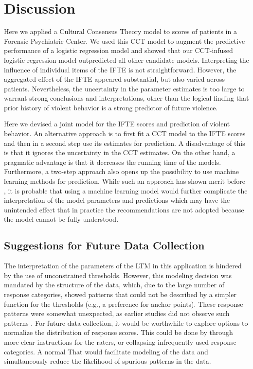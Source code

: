 \documentclass[a4paper,11pt]{article}
\begin{document}
\section{Discussion}
Here we applied a Cultural Consensus Theory model to scores of patients in a Forensic Psychiatric Center.
We used this CCT model to augment the predictive performance of a logistic regression model and showed that our CCT-infused logistic regression model outpredicted all other candidate models.
Interpreting the influence of individual items of the IFTE is not straightforward. 
However, the aggregated effect of the IFTE appeared substantial, but also varied across patients.
Nevertheless, the uncertainty in the parameter estimates is too large to warrant strong conclusions and interpretations, other than the logical finding that prior history of violent behavior is a strong predictor of future violence.

Here we devised a joint model for the IFTE scores and prediction of violent behavior.
An alternative approach is to first fit a CCT model to the IFTE scores and then in a second step use its estimates for prediction.
A disadvantage of this is that it ignores the uncertainty in the CCT estimates.
On the other hand, a pragmatic advantage is that it decreases the running time of the models.
Furthermore, a two-step approach also opens up the possibility to use machine learning methods for prediction.
While such an approach has shown merit before \parencite[see e.g.,][]{plonsky2017psychological}, it is probable that using a machine learning model would further complicate the interpretation of the model parameters and predictions which may have the unintended effect that in practice the recommendations are not adopted because the model cannot be fully understood.

\subsection{Suggestions for Future Data Collection}

The interpretation of the parameters of the LTM in this application is hindered by the use of unconstrained thresholds.
However, this modeling decision was mandated by the structure of the data, which, due to the large number of response categories, showed patterns that could not be described by a simpler function for the thresholds (e.g., a preference for anchor points).
These response patterns were somewhat unexpected, as earlier studies did not observe such patterns \parencite[e.g., see Figure 2 of ][]{schuringa2014inter}.
For future data collection, it would be worthwhile to explore options to normalize the distribution of response scores.
This could be done by through more clear instructions for the raters, or collapsing infrequently used response categories.
A normal That would facilitate modeling of the data and simultaneously reduce the likelihood of spurious patterns in the data.
\end{document}
